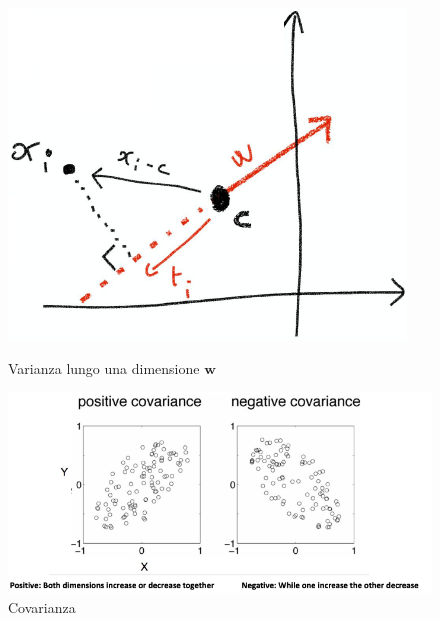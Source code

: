 		
		\begin{figure}
			\centering
			\begin{minipage}{.5\textwidth}
				\centering
				\includegraphics[width=0.6\linewidth]{imgs/chapter12/img1}
				\caption{Varianza lungo una dimensione $\mathbf{w}$}
				\label{fig:chapter12-01}
			\end{minipage}%
			\begin{minipage}{.5\textwidth}
				\centering
				\includegraphics[width=1\linewidth]{imgs/chapter12/img2}
				\caption{Covarianza}
				\label{fig:chapter12-02}
			\end{minipage}
		\end{figure}
		
